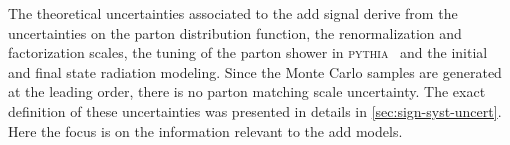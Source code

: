 The theoretical uncertainties associated to the \gls{add} signal derive from the
uncertainties on the parton distribution function, the renormalization and
factorization scales, the tuning of the parton shower in
\textsc{pythia}~\cite{PYTHIA8} and the initial and final state radiation
modeling. Since the Monte Carlo samples are generated at the leading order,
there is no parton matching scale uncertainty. The exact definition of these
uncertainties was presented in details in \cref{sec:sign-syst-uncert}. Here the
focus is on the information relevant to the \gls{add} models.
